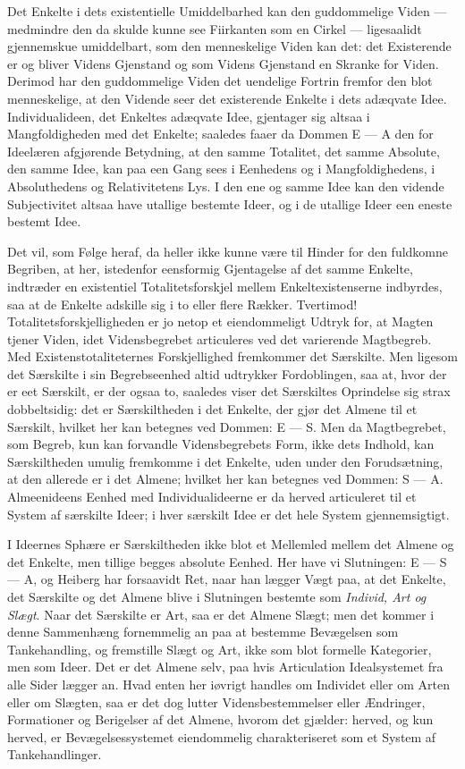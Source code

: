 \documentclass[12pt]{book}
\newcommand{\opage}[1]{\marginnote{\footnotesize\textit{[#1]}}}
\begin{document}
Det Enkelte i dets existentielle Umiddelbarhed kan den guddommelige Viden --- medmindre den da
skulde kunne see Fiirkanten som en Cirkel --- ligesaalidt gjennemskue umiddelbart, som den
menneskelige Viden kan det: det Existerende er og bliver Videns Gjenstand og som Videns Gjenstand en
Skranke for Viden. Derimod har den guddommelige Viden det uendelige Fortrin fremfor den blot
menneskelige, at den Vidende seer det existerende Enkelte i dets adæqvate Idee. Individualideen, det
Enkeltes adæqvate Idee, gjentager sig altsaa i Mangfoldigheden med det Enkelte; saaledes faaer da
Dommen E --- A den for Ideelæren afgjørende Betydning, at den samme Totalitet, det samme Absolute,
den samme Idee, kan paa een Gang sees i Eenhedens og i Mangfoldighedens, i Absoluthedens og
Relativitetens Lys. I den ene og samme Idee kan den vidende Subjectivitet altsaa have utallige
bestemte Ideer, og i de utallige Ideer een eneste bestemt Idee.

Det vil, som Følge heraf, da heller ikke kunne være til Hinder for den fuldkomne Begriben, at her,
istedenfor eensformig Gjentagelse af det samme Enkelte, indtræder en existentiel Totalitetsforskjel
mellem Enkeltexistenserne indbyrdes, saa at de Enkelte adskille sig i to eller flere Rækker.
Tvertimod! Totalitetsforskjelligheden er jo netop et eiendommeligt Udtryk for, at Magten tjener
Viden, idet Vidensbegrebet articuleres ved det varierende Magtbegreb. Med Existenstotaliteternes
Forskjellighed fremkommer det Særskilte. Men ligesom det Særskilte i sin Begrebseenhed altid
udtrykker Fordoblingen, saa at, hvor der er eet Særskilt, er der ogsaa to, saaledes viser det
Særskiltes Oprindelse sig strax dobbeltsidig: det er Særskiltheden i det Enkelte, der gjør det
Almene til et Særskilt, hvilket her kan betegnes ved Dommen: E --- S.
\opage{218} Men da Magtbegrebet, som Begreb, kun kan forvandle Vidensbegrebets Form, ikke dets Indhold, kan
Særskiltheden umulig fremkomme i det Enkelte, uden under den Forudsætning, at den allerede er i det
Almene; hvilket her kan betegnes ved Dommen: S --- A. Almeenideens Eenhed med Individualideerne er
da herved articuleret til et System af særskilte Ideer; i hver særskilt Idee er det hele System
gjennemsigtigt.

I Ideernes Sphære er Særskiltheden ikke blot et Mellemled mellem det Almene og det Enkelte, men
tillige begges absolute Eenhed. Her have vi Slutningen: E --- S --- A, og Heiberg har forsaavidt
Ret, naar han lægger Vægt paa, at det Enkelte, det Særskilte og det Almene blive i Slutningen
bestemte som \emph{Individ, Art og Slægt}. Naar det Særskilte er Art, saa er det Almene Slægt; men
det kommer i denne Sammenhæng fornemmelig an paa at bestemme Bevægelsen som Tankehandling, og
fremstille Slægt og Art, ikke som blot formelle Kategorier, men som Ideer. Det er det Almene selv,
paa hvis Articulation Idealsystemet fra alle Sider lægger an. Hvad enten her iøvrigt handles om
Individet eller om Arten eller om Slægten, saa er det dog lutter Vidensbestemmelser eller Ændringer,
Formationer og Berigelser af det Almene, hvorom det gjælder: herved, og kun herved, er
Bevægelsessystemet eiendommelig charakteriseret som et System af Tankehandlinger.
\end{document}
